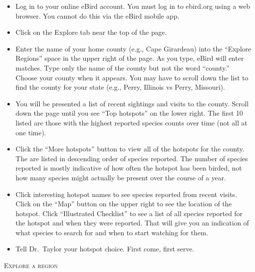 \documentclass[12pt]{article}
\begin{document}
\begin{itemize}
\item Log in to your online eBird account. You must log in to ebird.org using a web browser. You cannot do this via the eBird mobile app.

\item Click on the Explore tab near the top of the page.

\item Enter the name of your home county (e.g., Cape Girardeau) into the “Explore Regions” space in the upper right of the page. As you type, eBird will enter matches. Type only the name of the county but not the word “county.” Choose your county when it appears. You may have to scroll down the list to find the county for your state (e.g., Perry, Illinois vs Perry, Missouri).

\item You will be presented a list of recent sightings and visits to the county. Scroll down the page until you see “Top hotspots” on the lower right. The first 10 listed are those with the highest reported species counts over time (not all at one time). 

\item Click the “More hotspots” button to view all of the hotspots for the county. The are listed in descending order of species reported. The number of species reported is mostly indicative of how often the hotspot has been birded, not how many species might actually be present over the course of a year.

\item Click interesting hotspot names to see species reported from recent visits. Click on the “Map” button on the upper right to see the location of the hotspot. Click “Illustrated Checklist” to see a list of all species reported for the hotspot and when they were reported. That will give you an indication of what species to search for and when to start watching for them.

\item Tell Dr.~Taylor your hotspot choice. First come, first serve.

\end{itemize}

\textsc{Explore a region}
\end{document}
